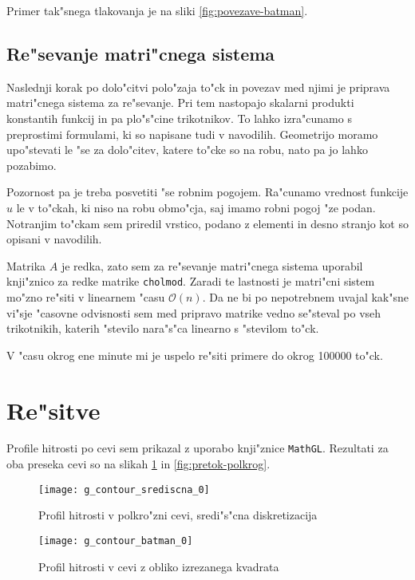 \documentclass[a4paper,10pt]{article}
\begin{document}
Primer tak"snega tlakovanja je na sliki \ref{fig:povezave-batman}. 

\subsection{Re"sevanje matri"cnega sistema}

Naslednji korak po dolo"citvi polo"zaja to"ck in povezav med njimi je priprava matri"cnega sistema za re"sevanje. Pri tem nastopajo skalarni produkti konstantih funkcij in pa plo"s"cine trikotnikov. To lahko izra"cunamo s preprostimi formulami, ki so napisane tudi v navodilih. Geometrijo moramo upo"stevati le "se za dolo"citev, katere to"cke so na robu, nato pa jo lahko pozabimo. 

Pozornost pa je treba posvetiti "se robnim pogojem. Ra"cunamo vrednost funkcije $u$ le v to"ckah, ki niso na robu obmo"cja, saj imamo robni pogoj "ze podan. Notranjim to"ckam sem priredil vrstico, podano z elementi in desno stranjo kot so opisani v navodilih. 

Matrika $A$ je redka, zato sem za re"sevanje matri"cnega sistema uporabil knji"znico za redke matrike \texttt{cholmod}. Zaradi te lastnosti je matri"cni sistem mo"zno re"siti v linearnem "casu $\mathcal{O}(n)$. Da ne bi po nepotrebnem uvajal kak"sne vi"sje "casovne odvisnosti sem med pripravo matrike vedno se"steval po vseh trikotnikih, katerih "stevilo nara"s"ca linearno s "stevilom to"ck. 

V "casu okrog ene minute mi je uspelo re"siti primere do okrog 100000 to"ck. 

\section{Re"sitve}

Profile hitrosti po cevi sem prikazal z uporabo knji"znice \texttt{MathGL}. Rezultati za oba preseka cevi so na slikah \ref{fig:profil-srediscna} in \ref{fig:pretok-polkrog}. 
 
\begin{figure}[H]
\centering
 \texttt{[image: g\_contour\_srediscna\_0]}
 \caption{Profil hitrosti v polkro"zni cevi, sredi"s"cna diskretizacija}
 \label{fig:profil-srediscna}
\end{figure}

\begin{figure}[H]
\centering
  \texttt{[image: g\_contour\_batman\_0]}
 \caption{Profil hitrosti v cevi z obliko izrezanega kvadrata}
 \label{fig:profil-kvadrat}
\end{figure}
\end{document}
